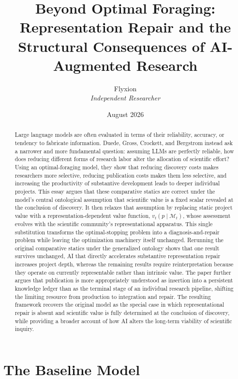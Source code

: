 \documentclass[11pt]{article}
\title{Beyond Optimal Foraging: Representation Repair and the Structural Consequences of AI-Augmented Research}
\author{Flyxion \\ \textit{Independent Researcher}}
\date{August 2026}
\begin{document}
\maketitle

\begin{abstract}
\noindent Large language models are often evaluated in terms of their reliability, accuracy, or tendency to fabricate information. Duede, Gross, Crockett, and Bergstrom instead ask a narrower and more fundamental question: assuming LLMs are perfectly reliable, how does reducing different forms of research labor alter the allocation of scientific effort? Using an optimal-foraging model, they show that reducing discovery costs makes researchers more selective, reducing publication costs makes them less selective, and increasing the productivity of substantive development leads to deeper individual projects. This essay argues that these comparative statics are correct under the model's central ontological assumption that scientific value is a fixed scalar revealed at the conclusion of discovery. It then relaxes that assumption by replacing static project value with a representation-dependent value function, $v_t(p \mid \mathcal{M}_t)$, whose assessment evolves with the scientific community's representational apparatus. This single substitution transforms the optimal-stopping problem into a diagnosis-and-repair problem while leaving the optimization machinery itself unchanged. Rerunning the original comparative statics under the generalized ontology shows that one result survives unchanged, AI that directly accelerates substantive representation repair increases project depth, whereas the remaining results require reinterpretation because they operate on currently representable rather than intrinsic value. The paper further argues that publication is more appropriately understood as insertion into a persistent knowledge ledger than as the terminal stage of an individual research pipeline, shifting the limiting resource from production to integration and repair. The resulting framework recovers the original model as the special case in which representational repair is absent and scientific value is fully determined at the conclusion of discovery, while providing a broader account of how AI alters the long-term viability of scientific inquiry.
\end{abstract}

\newpage

\section{The Baseline Model}
\end{document}
